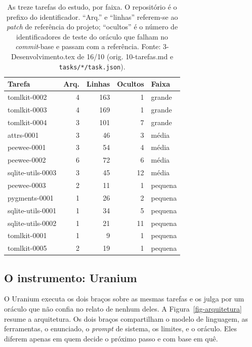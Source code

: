 \begin{table}[ht!]
\centering
\caption{As treze tarefas do estudo, por faixa. O repositório é o prefixo do identificador. ``Arq.'' e ``linhas'' referem-se ao \textit{patch} de referência do projeto; ``ocultos'' é o número de identificadores de teste do oráculo que falham no \textit{commit}-base e passam com a referência. Fonte: 3-Desenvolvimento.tex de 16/10 (orig. 10-tarefas.md e \texttt{tasks/*/task.json}).}
\label{tab-tarefas}
\footnotesize
\begin{tabular}{lrrrl}
\toprule
Tarefa & Arq. & Linhas & Ocultos & Faixa \\
\midrule
tomlkit-0002 & 4 & 163 & 1 & grande \\
tomlkit-0003 & 4 & 169 & 1 & grande \\
tomlkit-0004 & 3 & 101 & 7 & grande \\
attrs-0001 & 3 & 46 & 3 & média \\
peewee-0001 & 3 & 54 & 4 & média \\
peewee-0002 & 6 & 72 & 6 & média \\
sqlite-utils-0003 & 3 & 45 & 12 & média \\
peewee-0003 & 2 & 11 & 1 & pequena \\
pygments-0001 & 1 & 26 & 2 & pequena \\
sqlite-utils-0001 & 1 & 34 & 5 & pequena \\
sqlite-utils-0002 & 1 & 21 & 11 & pequena \\
tomlkit-0001 & 1 & 9 & 1 & pequena \\
tomlkit-0005 & 2 & 19 & 1 & pequena \\
\bottomrule
\end{tabular}
\end{table}

\subsection{O instrumento: Uranium}
\label{ssec:uranium}

O Uranium executa os dois braços sobre as mesmas tarefas e os julga por um oráculo que não confia no relato de nenhum deles. A Figura~\ref{fig-arquitetura} resume a arquitetura. Os dois braços compartilham o modelo de linguagem, as ferramentas, o enunciado, o \textit{prompt} de sistema, os limites,  e o oráculo. Eles diferem apenas em quem decide o próximo passo e com base em quê.


